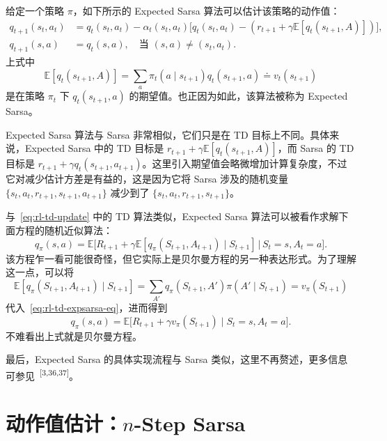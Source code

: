 \begin{derivation}
\label{box:rl-td-expsarsa}
给定一个策略 $\pi$，如下所示的 Expected Sarsa 算法可以估计该策略的动作值：
\begin{align*}
  q_{t+1}(s_t, a_t) &= q_t(s_t, a_t) - \alpha_t(s_t, a_t) \Big[ q_t(s_t, a_t) - (r_{t+1} + \gamma \mathbb{E}[q_t(s_{t+1}, A)]) \Big], \\
  q_{t+1}(s, a) &= q_t(s, a), \quad \text{当 } (s, a) \neq (s_t, a_t).
\end{align*}
上式中
\[
  \mathbb{E}[q_t(s_{t+1}, A)] = \sum_a \pi_t(a \mid s_{t+1}) q_t(s_{t+1}, a) \doteq v_t(s_{t+1})
\]
是在策略 $\pi_t$ 下 $q_t(s_{t+1}, a)$ 的期望值。也正因为如此，该算法被称为 Expected Sarsa。

Expected Sarsa 算法与 Sarsa 非常相似，它们只是在 TD 目标上不同。具体来说，Expected Sarsa 中的 TD 目标是 $r_{t+1} + \gamma \mathbb{E}[q_t(s_{t+1}, A)]$，而 Sarsa 的 TD 目标是 $r_{t+1} + \gamma q_t(s_{t+1}, a_{t+1})$。这里引入期望值会略微增加计算复杂度，不过它对减少估计方差是有益的，这是因为它将 Sarsa 涉及的随机变量 $\{s_t, a_t, r_{t+1}, s_{t+1}, a_{t+1}\}$ 减少到了 $\{s_t, a_t, r_{t+1}, s_{t+1}\}$。

与~\eqref{eq:rl-td-update} 中的 TD 算法类似，Expected Sarsa 算法可以被看作求解下面方程的随机近似算法：
\begin{equation}
  q_{\pi}(s, a) = \mathbb{E}\Big[ R_{t+1} + \gamma \mathbb{E}[q_{\pi}(S_{t+1}, A_{t+1}) \mid S_{t+1}] \,\Big|\, S_t = s, A_t = a \Big].
  \label{eq:rl-td-expsarsa-eq}
\end{equation}
该方程乍一看可能很奇怪，但它实际上是贝尔曼方程的另一种表达形式。为了理解这一点，可以将
\[
  \mathbb{E}[q_{\pi}(S_{t+1}, A_{t+1}) \mid S_{t+1}] = \sum_{A'} q_{\pi}(S_{t+1}, A') \pi(A' \mid S_{t+1}) = v_{\pi}(S_{t+1})
\]
代入~\eqref{eq:rl-td-expsarsa-eq}，进而得到
\[
  q_{\pi}(s, a) = \mathbb{E}\Big[ R_{t+1} + \gamma v_{\pi}(S_{t+1}) \mid S_t = s, A_t = a \Big].
\]
不难看出上式就是贝尔曼方程。

最后，Expected Sarsa 的具体实现流程与 Sarsa 类似，这里不再赘述，更多信息可参见~\textsuperscript{[3,36,37]}。
\end{derivation}

\section{动作值估计：\texorpdfstring{$n$}{n}-Step Sarsa}
\label{sec:rl-td-nstep}

